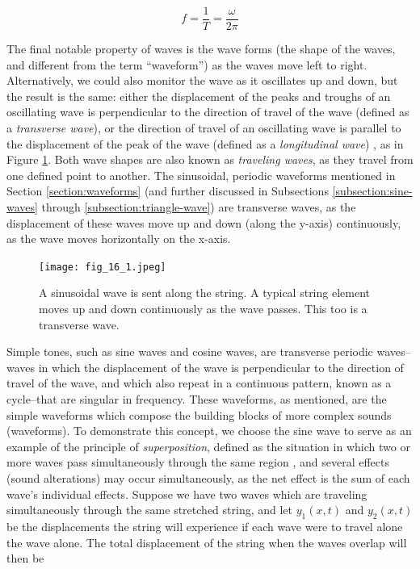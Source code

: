 \begin{equation}
	f = \frac{1}{T} = \frac{\omega}{2\pi}
	\label{eq:physics-freq-eq}
\end{equation}

The final notable property of waves is the wave forms (the shape of the waves, and different from the term ``waveform'') as the waves move left to right. Alternatively, we could also monitor the wave as it oscillates up and down, but the result is the same: either the displacement of the peaks and troughs of an oscillating wave is perpendicular to the direction of travel of the wave (defined as a \textit{transverse wave}), or the direction of travel of an oscillating wave is parallel to the displacement of the peak of the wave (defined as a \textit{longitudinal wave}) \cite{Halliday_Resnick_Walker_2005}, as in Figure \ref{fig:transverse-wave-longitudinal-wave}. Both wave shapes are also known as \textit{traveling waves}, as they travel from one defined point to another. The sinusoidal, periodic waveforms mentioned in Section \ref{section:waveforms} (and further discussed in Subsections \ref{subsection:sine-waves} through \ref{subsection:triangle-wave}) are transverse waves, as the displacement of these waves move up and down (along the y-axis) continuously, as the wave moves horizontally on the x-axis.

\begin{figure}[ht]
  \centering
  \texttt{[image: fig\_16\_1.jpeg]}
  \caption{A sinusoidal wave is sent along the string. A typical string element moves up and down continuously as the wave passes. This too is a transverse wave.} \cite{Halliday_Resnick_Walker_2005}
  \label{fig:transverse-wave-longitudinal-wave}
\end{figure}

Simple tones, such as sine waves and cosine waves, are transverse periodic waves--waves in which the displacement of the wave is perpendicular to the direction of travel of the wave, and which also repeat in a continuous pattern, known as a cycle--that are singular in frequency. These waveforms, as mentioned, are the simple waveforms which compose the building blocks of more complex sounds (waveforms). To demonstrate this concept, we choose the sine wave to serve as an example of the principle of \textit{superposition}, defined as the situation in which two or more waves pass simultaneously through the same region \cite{Halliday_Resnick_Walker_2005}, and several effects (sound alterations) may occur simultaneously, as the net effect is the sum of each wave's individual effects. Suppose we have two waves which are traveling simultaneously through the same stretched string, and let $y_1(x, t)$ and $y_2(x, t)$ be the displacements the string will experience if each wave were to travel alone the wave alone. The total displacement of the string when the waves overlap will then be


